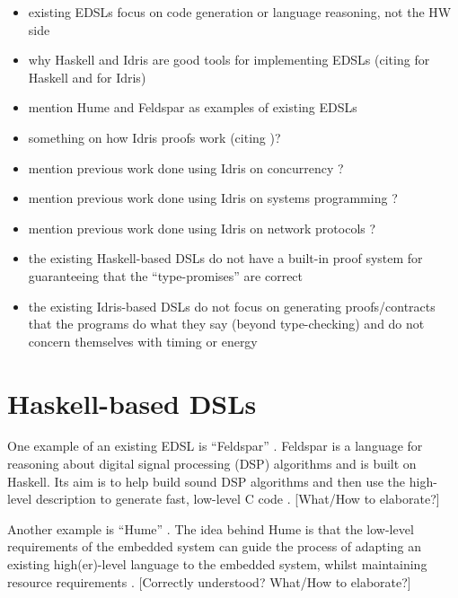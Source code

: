 \begin{itemize}
	\item existing EDSLs focus on code generation or language reasoning, not the
	      HW side
	\item why Haskell and Idris are good tools for implementing EDSLs (citing
    	  \cite{10.1007/3-540-45350-4_5,685738,hudak1996building} for Haskell
    	  and \cite{brady2015embedded} for Idris)
	\item mention Hume \cite{10.1007/978-3-540-39815-8_3} and Feldspar
  		  \cite{5558637} as examples of existing EDSLs
	\item something on how Idris proofs work (citing \cite{brady2015embedded})?
	\item mention previous work done using Idris on concurrency
		  \cite{brady2010correct}?
	\item mention previous work done using Idris on systems programming
		  \cite{10.1007/978-3-642-27694-1_18,Brady:2011:ISP:1929529.1929536}?
	\item mention previous work done using Idris on network protocols
		  \cite{5158855}?
	\item the existing Haskell-based DSLs do not have a built-in proof system
		  for guaranteeing that the ``type-promises'' are correct
	\item the existing Idris-based DSLs do not focus on generating
		  proofs/contracts that the programs do what they say (beyond
		  type-checking) and do not concern themselves with timing or energy
\end{itemize}

\section{Haskell-based DSLs}
	One example of an existing EDSL is ``Feldspar'' \cite{5558637}. Feldspar is a language for reasoning about digital signal processing (DSP) algorithms and is built on Haskell. Its aim is to help build sound DSP algorithms and then use the high-level description to generate fast, low-level C code \cite{5558637}. [What/How to elaborate?]
	
	Another example is ``Hume'' \cite{10.1007/978-3-540-39815-8_3}. The idea behind Hume is that the low-level requirements of the embedded system can guide the process of adapting an existing high(er)-level language to the embedded system, whilst maintaining resource requirements \cite{10.1007/978-3-540-39815-8_3}. [Correctly understood? What/How to elaborate?]


